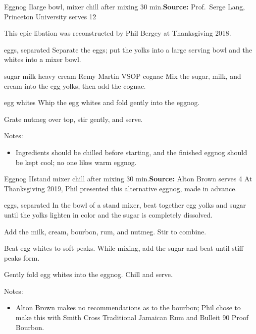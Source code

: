 \begin{recipe}{Eggnog I}{large bowl, mixer \hfill chill after mixing \hfill 30 min.}{\textbf{Source:} Prof.\ Serge Lang, Princeton University \hfill serves 12}

 \freeform This epic libation was reconstructed by Phil Bergey at Thanksgiving 2018.

 \ing[12]{} {eggs, separated}
 Separate the eggs; put the yolks into a large serving bowl and the whites into a mixer bowl.

  {sugar}
  {milk}
  {heavy cream}
  {Remy Martin VSOP cognac}
 Mix the sugar, milk, and cream into the egg yolks, then add the cognac.

 \ing[12]{} {egg whites}
 Whip the egg whites and fold gently into the eggnog.

 Grate nutmeg over top, stir gently, and serve.

 \freeform Notes:
 \begin{itemize}
  \item Ingredients should be chilled before starting, and the finished eggnog should be kept cool; no one likes warm eggnog.
 \end{itemize}

\end{recipe}

\begin{recipe}{Eggnog II}{stand mixer \hfill chill after mixing \hfill 30 min.}{\textbf{Source:} Alton Brown \hfill serves 4}
 \freeform At Thanksgiving 2019, Phil presented this alternative eggnog, made in advance.

 \ing[4]{} {eggs, separated}
 In the bowl of a stand mixer, beat together egg yolks and sugar until the yolks lighten in color and the sugar is completely dissolved.

 Add the milk, cream, bourbon, rum, and nutmeg. Stir to combine.

 Beat egg whites to soft peaks. While mixing, add the sugar and beat until stiff peaks form.

 \newstep Gently fold egg whites into the eggnog. Chill and serve.

 \freeform Notes:
 \begin{itemize}
  \item Alton Brown makes no recommendations as to the bourbon; Phil chose to make this with Smith \And Cross Traditional Jamaican Rum and Bulleit 90 Proof Bourbon.
 \end{itemize}
\end{recipe}
